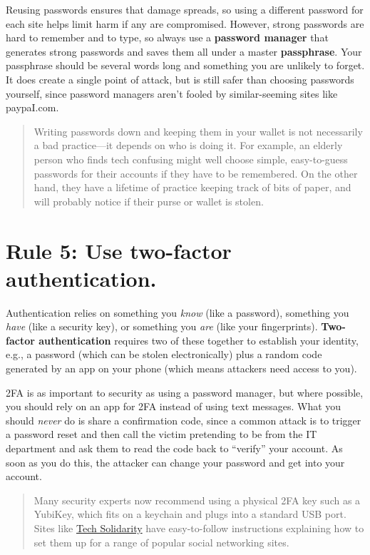 \documentclass[10pt,letterpaper]{article}
\begin{document}
Reusing passwords ensures that damage spreads, so using a different password for
each site helps limit harm if any are compromised. However, strong passwords are
hard to remember and to type, so always use a \textbf{password manager} that
generates strong passwords and saves them all under a master \textbf{passphrase}.
Your passphrase should be several words long and something you are unlikely to
forget. It does create a single point of attack, but is still safer than
choosing passwords yourself, since password managers aren't fooled by
similar-seeming sites like paypaI.com.

\begin{quote}
  Writing passwords down and keeping them in your wallet is not necessarily a
  bad practice---it depends on who is doing it. For example, an elderly person
  who finds tech confusing might well choose simple, easy-to-guess passwords for
  their accounts if they have to be remembered. On the other hand, they have a
  lifetime of practice keeping track of bits of paper, and will probably notice
  if their purse or wallet is stolen.
\end{quote}

\section*{Rule 5: Use two-factor authentication.}

Authentication relies on something you \emph{know} (like a password), something
you \emph{have} (like a security key), or something you \emph{are} (like your
fingerprints). \textbf{Two-factor authentication} requires two of these together
to establish your identity, e.g., a password (which can be stolen
electronically) plus a random code generated by an app on your phone (which
means attackers need access to you).

2FA is as important to security as using a password manager, but where possible,
you should rely on an app for 2FA instead of using text messages. What you
should \emph{never} do is share a confirmation code, since a common attack is to
trigger a password reset and then call the victim pretending to be from the IT
department and ask them to read the code back to ``verify'' your account. As
soon as you do this, the attacker can change your password and get into your
account.

\begin{quote}
  Many security experts now recommend using a physical 2FA key such as a
  YubiKey, which fits on a keychain and plugs into a standard USB port.  Sites
  like \href{https://techsolidarity.org/}{Tech Solidarity} have easy-to-follow
  instructions explaining how to set them up for a range of popular social
  networking sites.
\end{quote}
\end{document}
